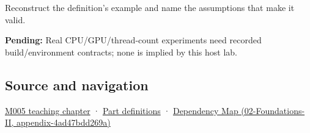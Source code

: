 Reconstruct the definition's example and name the assumptions that make it valid.

\textbf{Pending:} Real CPU/GPU/thread-count experiments need recorded build/environment contracts; none is implied by this host lab.

\subsection{Source and navigation}\label{source-and-navigation}

\href{Continuous\%20Notes/Computing\%20Foundations\%20-\%20From\%20Bits\%20to\%20C++\%20and\%20Systems\%20APIs\#When\%20arithmetic\%20meets\%20uncertainty}{M005 teaching chapter} · \hyperref[appendix-fd090d982a15]{Part definitions} · \href{}{Dependency Map (02-Foundations-II, appendix-4ad47bdd269a)}

